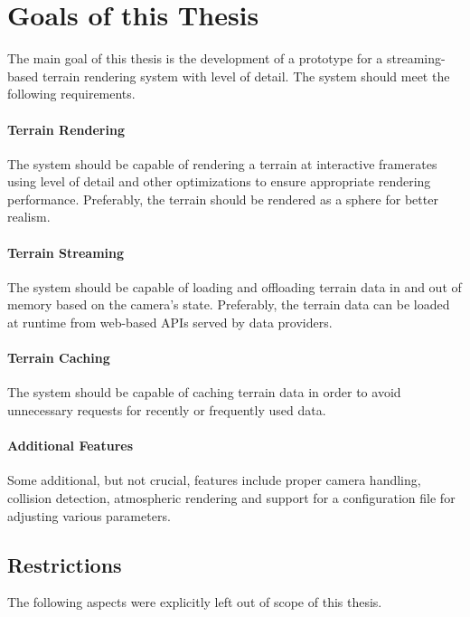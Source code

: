 \section{Goals of this Thesis}
The main goal of this thesis is the development of a prototype for 
a streaming-based terrain rendering system 
with level of detail.
The system should meet the following requirements.

\paragraph{Terrain Rendering} The system should be capable of rendering 
                               a terrain at interactive framerates using 
                               level of detail and other optimizations to ensure appropriate rendering 
                               performance. Preferably, the terrain should be rendered
                               as a sphere for better realism.
\paragraph{Terrain Streaming}  The system should be capable of loading 
                               and offloading terrain data in and out of memory based on 
                              the camera's state.
                               Preferably, the terrain data can be loaded at runtime
                              from web-based APIs served by data providers.
\paragraph{Terrain Caching} The system should be capable of caching terrain 
                             data in order to avoid unnecessary requests
                             for recently or frequently used data.
\paragraph{Additional Features} Some additional, but not crucial, features include proper camera handling,
                               collision detection, atmospheric rendering 
                               and support for a configuration file for 
                               adjusting various parameters.

\subsection{Restrictions}
The following aspects were explicitly left out of scope of this thesis.

